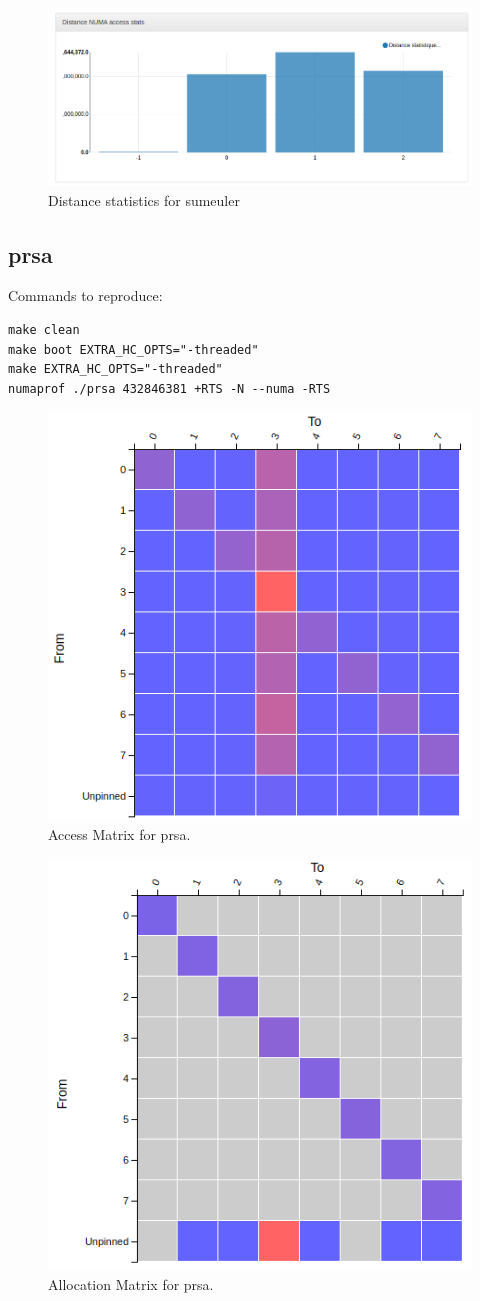 \documentclass[a4paper,11pt]{article}
\begin{document}
\begin{figure}[!htb]
    \centering
    \includegraphics[width=\linewidth]{TechMemo/results/sumeuler/distance_sumeuler.png}
    \caption{Distance statistics for sumeuler}
    \label{fig:sumeuler_distance}
\end{figure}

\subsection{prsa}

Commands to reproduce:
\begin{lstlisting}
make clean
make boot EXTRA_HC_OPTS="-threaded"
make EXTRA_HC_OPTS="-threaded"
numaprof ./prsa 432846381 +RTS -N --numa -RTS
\end{lstlisting}

\begin{figure}[!htb]
    \centering
    \includegraphics[width=0.5\linewidth]{TechMemo/results/prsa/prsa_access.png}
    \caption{Access Matrix for prsa.}
    \label{fig:prsa_access_matrix}
\end{figure}

\begin{figure}[!htb]
    \centering
    \includegraphics[width=0.5\linewidth]{TechMemo/results/prsa/prsa_allioc.png}
    \caption{Allocation Matrix for prsa.}
    \label{fig:prsa_alloc_matrix}
\end{figure}
\end{document}
